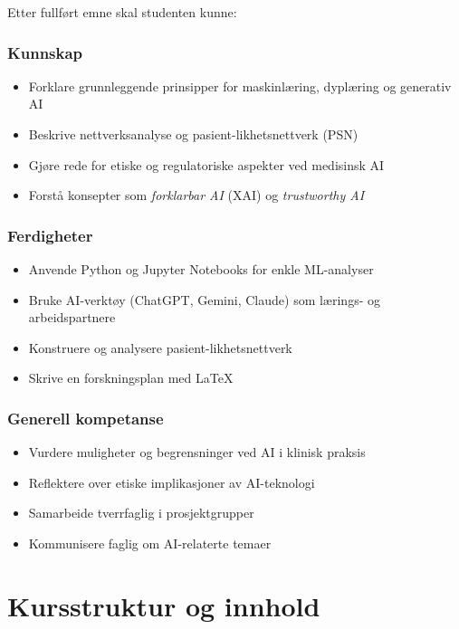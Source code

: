 \documentclass[11pt,a4paper]{article}
\begin{document}
Etter fullført emne skal studenten kunne:

\subsubsection*{Kunnskap}
\begin{itemize}[nosep]
    \item Forklare grunnleggende prinsipper for maskinlæring, dyplæring og generativ AI
    \item Beskrive nettverksanalyse og pasient-likhetsnettverk (PSN)
    \item Gjøre rede for etiske og regulatoriske aspekter ved medisinsk AI
    \item Forstå konsepter som \emph{forklarbar AI} (XAI) og \emph{trustworthy AI}
\end{itemize}

\subsubsection*{Ferdigheter}
\begin{itemize}[nosep]
    \item Anvende Python og Jupyter Notebooks for enkle ML-analyser
    \item Bruke AI-verktøy (ChatGPT, Gemini, Claude) som lærings- og arbeidspartnere
    \item Konstruere og analysere pasient-likhetsnettverk
    \item Skrive en forskningsplan med LaTeX
\end{itemize}

\subsubsection*{Generell kompetanse}
\begin{itemize}[nosep]
    \item Vurdere muligheter og begrensninger ved AI i klinisk praksis
    \item Reflektere over etiske implikasjoner av AI-teknologi
    \item Samarbeide tverrfaglig i prosjektgrupper
    \item Kommunisere faglig om AI-relaterte temaer
\end{itemize}

\section{Kursstruktur og innhold}
\end{document}

